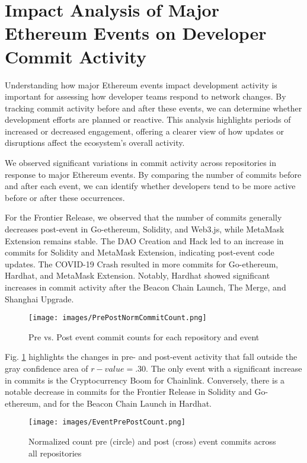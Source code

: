\section{Impact Analysis of Major Ethereum Events on Developer Commit Activity}\label{RQ2}

Understanding how major Ethereum events impact development activity is important for assessing how developer teams respond to network changes. By tracking commit activity before and after these events, we can determine whether development efforts are planned or reactive. This analysis highlights periods of increased or decreased engagement, offering a clearer view of how updates or disruptions affect the ecosystem’s overall activity.

We observed significant variations in commit activity across repositories in response to major Ethereum events. By comparing the number of commits before and after each event, we can identify whether developers tend to be more active before or after these occurrences.

For the Frontier Release, we observed that the number of commits generally decreases post-event in Go-ethereum, Solidity, and Web3.js, while MetaMask Extension remains stable. The DAO Creation and Hack led to an increase in commits for Solidity and MetaMask Extension, indicating post-event code updates. The COVID-19 Crash resulted in more commits for Go-ethereum, Hardhat, and MetaMask Extension. Notably, Hardhat showed significant increases in commit activity after the Beacon Chain Launch, The Merge, and Shanghai Upgrade.

\begin{figure}
    \centering
    \texttt{[image: images/PrePostNormCommitCount.png]}
    \caption{Pre vs. Post event commit counts for each repository and event}
    \label{fig:PrePostNormCommitCount}
\end{figure}

Fig. \ref{fig:PrePostNormCommitCount} highlights the changes in pre- and post-event activity that fall outside the gray confidence area of $r-value = .30$. The only event with a significant increase in commits is the Cryptocurrency Boom for Chainlink. Conversely, there is a notable decrease in commits for the Frontier Release in Solidity and Go-ethereum, and for the Beacon Chain Launch in Hardhat.

\begin{figure}
    \centering
    \texttt{[image: images/EventPrePostCount.png]}
    \caption{Normalized count pre (circle) and post (cross) event commits across all repositories}
    \label{fig:EventPrePostCount}
\end{figure}

